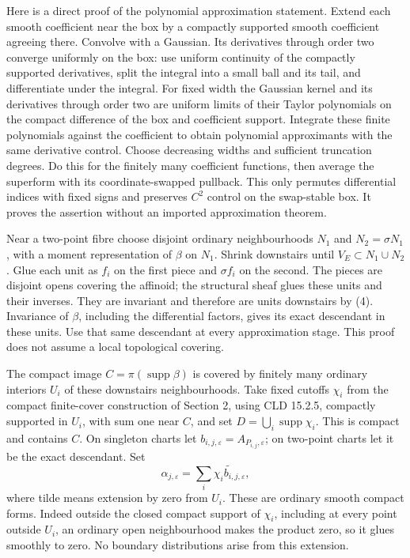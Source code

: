 \documentclass[
  11pt,
]{article}
\begin{document}
Here is a direct proof of the polynomial approximation statement. Extend
each smooth coefficient near the box by a compactly supported smooth
coefficient agreeing there. Convolve with a Gaussian. Its derivatives
through order two converge uniformly on the box: use uniform continuity
of the compactly supported derivatives, split the integral into a small
ball and its tail, and differentiate under the integral. For fixed width
the Gaussian kernel and its derivatives through order two are uniform
limits of their Taylor polynomials on the compact difference of the box
and coefficient support. Integrate these finite polynomials against the
coefficient to obtain polynomial approximants with the same derivative
control. Choose decreasing widths and sufficient truncation degrees. Do
this for the finitely many coefficient functions, then average the
superform with its coordinate-swapped pullback. This only permutes
differential indices with fixed signs and preserves \(C^2\) control on
the swap-stable box. It proves the assertion without an imported
approximation theorem.

Near a two-point fibre choose disjoint ordinary neighbourhoods \(N_1\)
and \(N_2=\sigma N_1\), with a moment representation of \(\beta\) on
\(N_1\). Shrink downstairs until \(V_E\subset N_1\cup N_2\). Glue each
unit as \(f_i\) on the first piece and \(\sigma f_i\) on the second. The
pieces are disjoint opens covering the affinoid; the structural sheaf
glues these units and their inverses. They are invariant and therefore
are units downstairs by (4). Invariance of \(\beta\), including the
differential factors, gives its exact descendant in these units. Use
that same descendant at every approximation stage. This proof does not
assume a local topological covering.

The compact image \(C=\pi(\operatorname{supp}\beta)\) is covered by
finitely many ordinary interiors \(U_i\) of these downstairs
neighbourhoods. Take fixed cutoffs \(\chi_i\) from the compact finite-cover
construction of Section 2, using CLD 15.2.5, compactly supported in \(U_i\), with sum one near \(C\), and set
\(D=\bigcup_i\operatorname{supp}\chi_i\). This is compact and contains
\(C\). On singleton charts let
\(b_{i,j,\varepsilon}=A_{P_{i,j},\varepsilon}\); on two-point charts let
it be the exact descendant. Set \[
 \alpha_{j,\varepsilon}=
        \sum_i\widetilde{\chi_i b_{i,j,\varepsilon}},        \tag{26}
\] where tilde means extension by zero from \(U_i\). These are ordinary
smooth compact forms. Indeed outside the closed compact support of
\(\chi_i\), including at every point outside \(U_i\), an ordinary open
neighbourhood makes the product zero, so it glues smoothly to zero. No
boundary distributions arise from this extension.
\end{document}
